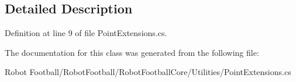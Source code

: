 \subsection{Detailed Description}


Definition at line 9 of file Point\-Extensions.\-cs.



The documentation for this class was generated from the following file\-:\begin{DoxyCompactItemize}
\item 
Robot Football/\-Robot\-Football/\-Robot\-Football\-Core/\-Utilities/Point\-Extensions.\-cs\end{DoxyCompactItemize}
